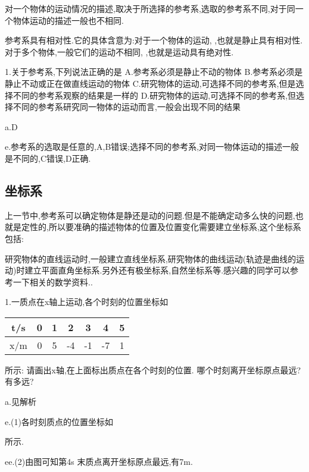 对一个物体的运动情况的描述,取决于所选择的参考系,选取的参考系不同,对于同一个物体运动的描述一般也不相同.

参考系具有相对性.它的具体含意为:对于一个物体的运动,  ,也就是静止具有相对性.对于多个物体,一般它们的运动不相同,  ,也就是运动具有绝对性.

\begin{xuanze}[example]
   1.关于参考系,下列说法正确的是
   A.参考系必须是静止不动的物体
   B.参考系必须是静止不动或正在做直线运动的物体
   C.研究物体的运动,可选择不同的参考系,但是选择不同的参考系观察的结果是一样的
   D.研究物体的运动,可选择不同的参考系,但选择不同的参考系研究同一物体的运动而言,一般会出现不同的结果

   a.D

   e.参考系的选取是任意的,A,B错误;选择不同的参考系,对同一物体运动的描述一般是不同的,C错误,D正确.

\end{xuanze}

\subsection{坐标系}
上一节中,参考系可以确定物体是静还是动的问题.但是不能确定动多么快的问题,也就是定性的,所以要准确的描述物体的位置及位置变化需要建立坐标系,这个坐标系包括:

研究物体的直线运动时,一般建立直线坐标系,研究物体的曲线运动(轨迹是曲线的运动)时建立平面直角坐标系.另外还有极坐标系,自然坐标系等.感兴趣的同学可以参考一下相关的数学资料..

\begin{jisuan}[example]
   1.一质点在x轴上运动,各个时刻的位置坐标如
   \begin{tabular}{|*{7}{c|}}
      \hline
      t/s & 0 & 1 & 2 & 3 & 4 & 5\\
      \hline
      x/m & 0 & 5 & -4 & -1 & -7 & 1\\
      \hline
   \end{tabular}
   所示:
   \qitem 请画出x轴,在上面标出质点在各个时刻的位置.
   \qitem 哪个时刻离开坐标原点最远?有多远?

   a.见解析

   e.(1)各时刻质点的位置坐标如
   所示.

   ee.(2)由图可知第4s 末质点离开坐标原点最远,有7m.


\end{jisuan}


